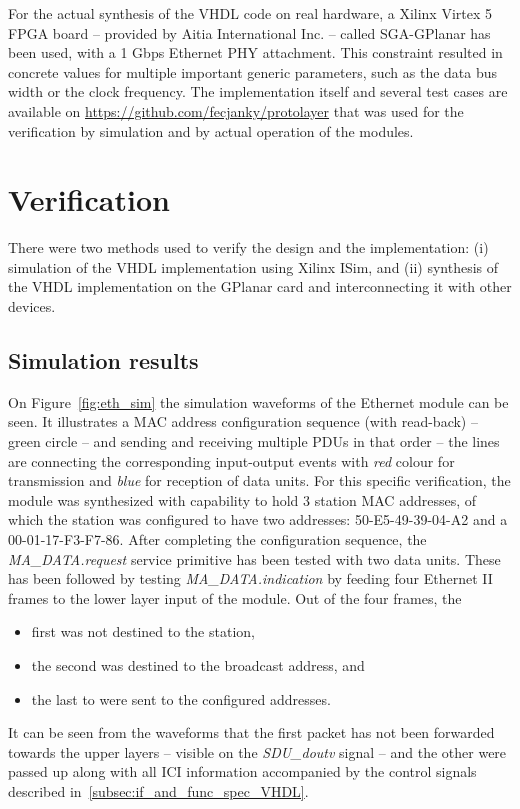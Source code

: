 \documentclass[conference]{IEEEtran}
\begin{document}
For the actual synthesis of the VHDL code on real hardware, a Xilinx Virtex 5 FPGA board -- provided by Aitia International Inc. -- called SGA-GPlanar \cite{GPlanar} has been used, with a 1 Gbps Ethernet PHY attachment. This constraint resulted in concrete values for multiple important generic parameters, such as the data bus width or the clock frequency.
The implementation itself and several test cases are available on \cite{GIT_protolayer} \url{https://github.com/fecjanky/protolayer} that was used for the verification by simulation and by actual operation of the modules.

\section{Verification}\label{sec:Verification}

There were two methods used to verify the design and the implementation: (i) simulation of the VHDL implementation using Xilinx ISim, and (ii) synthesis of the VHDL implementation on the GPlanar card and interconnecting it with other devices.

\subsection{Simulation results}

On Figure~\ref{fig:eth_sim} the simulation waveforms of the Ethernet module can be seen. It illustrates a MAC address configuration sequence (with read-back) -- green circle -- and sending and receiving multiple PDUs in that order -- the lines are connecting the corresponding input-output events with \emph{red} colour for transmission and \emph{blue} for reception of data units. For this specific verification, the module was synthesized with capability to hold 3 station MAC addresses, of which the station was configured to have two addresses: 50-E5-49-39-04-A2 and a 00-01-17-F3-F7-86. After completing the configuration sequence, the \emph{MA\_DATA.request} service primitive has been tested with two data units. These has been followed by testing \emph{MA\_DATA.indication} by feeding four Ethernet II frames to the lower layer input of the module. Out of the four frames, the 
\begin{itemize}
\renewcommand \labelitemi{--}
\item first was not destined to the station,
\item the second was destined to the broadcast address, and
\item the last to were sent to the configured addresses.
\end{itemize}
It can be seen from the waveforms that the first packet has not been forwarded towards the upper layers -- visible on the \emph{SDU\_doutv} signal -- and the other were passed up along with all ICI information accompanied by the control signals described in~\ref{subsec:if_and_func_spec_VHDL}.
\end{document}
